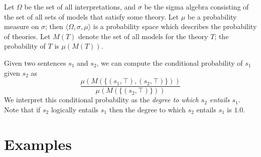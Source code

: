 \documentclass[letterpaper]{article}
\begin{document}
Let $\Omega$ be the set of all interpretations, and $\sigma$ be the
sigma algebra consisting of the set of all sets of models that satisfy
some theory. Let $\mu$ be a probability measure on $\sigma$; then
$\langle\Omega,\sigma,\mu\rangle$ is a probability space which
describes the probability of theories. Let $M(T)$ denote the set of
all models for the theory $T$; the probability of $T$ is $\mu(M(T))$.


Given two sentences $s_1$ and $s_2$, we can compute the conditional
probability of $s_1$ given $s_2$ as
$$\frac{\mu(M(\{(s_1, \top), (s_2, \top)\}))}{\mu(M(\{(s_2,\top)\}))}$$
We interpret this conditional probability as the {\em degree to which $s_2$ entails $s_1$\/}. Note that if $s_2$ logically entails $s_1$ then the degree to which  $s_2$ entails $s_1$ is $1.0$.



\section{Examples}
\end{document}
